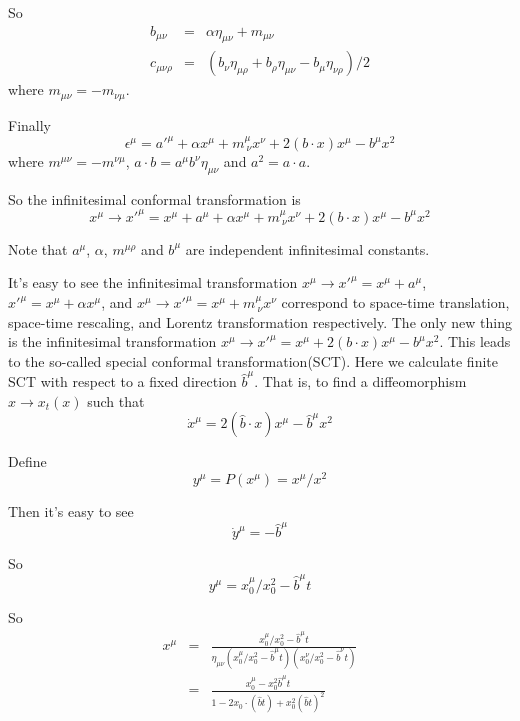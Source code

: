 \documentclass[12pt]{book}
\begin{document}
	So
	\begin{eqnarray}
		b_{\mu\nu}&=&\alpha\eta_{\mu\nu}+m_{\mu\nu}\\
		c_{\mu\nu\rho}&=&(b_\nu\eta_{\mu\rho}+b_\rho\eta_{\mu\nu}-b_\mu\eta_{\nu\rho})/2
	\end{eqnarray}
	where $m_{\mu\nu}=-m_{\nu\mu}$.
	
	Finally
	\begin{equation}
		\epsilon^\mu=a'^\mu+\alpha x^\mu+m^\mu_{\ \nu} x^\nu+2(b\cdot x)x^\mu-b^\mu x^2
	\end{equation}
	where $m^{\mu\nu}=-m^{\nu\mu}$, $a\cdot b=a^\mu b^\nu \eta_{\mu\nu}$ and $a^2=a\cdot a$.
	
	So the infinitesimal conformal transformation is 
	\begin{equation}
		x^\mu\rightarrow x'^\mu=x^\mu+a^\mu+\alpha x^\mu+m^\mu_{\ \nu} x^\nu+2(b\cdot x)x^\mu-b^\mu x^2
	\end{equation}
	
	Note that $a^\mu$, $\alpha$, $m^{\mu\rho}$ and $b^\mu$ are independent infinitesimal constants.
	
	It's easy to see the infinitesimal transformation $x^\mu\rightarrow x'^\mu=x^\mu+a^\mu$, $x'^\mu=x^\mu+\alpha x^\mu$, and $x^\mu\rightarrow x'^\mu=x^\mu+m^\mu_{\ \nu}x^\nu$ correspond to space-time translation, space-time rescaling, and Lorentz transformation respectively. The only new thing is the infinitesimal transformation $x^\mu\rightarrow x'^\mu=x^\mu+2(b\cdot x)x^\mu-b^\mu x^2$. This leads to the so-called special conformal transformation(SCT). Here we calculate finite SCT with respect to a fixed direction $\hat b^\mu$. That is, to find a diffeomorphism $x\rightarrow x_t(x)$ such that 
	\begin{equation}
		\dot x^\mu=2(\hat b\cdot x)x^\mu-\hat b^\mu x^2	
	\end{equation}
	
	Define
	\begin{equation}
		y^\mu=P(x^\mu)=x^\mu/x^2
	\end{equation}
	
	Then it's easy to see
	\begin{equation}
		\dot y^\mu=-\hat b^\mu
	\end{equation}
	
	So
	\begin{equation}
		y^\mu=x_0^\mu/x_0^2-\hat b^\mu t
	\end{equation}
	
	So
	\begin{eqnarray}
		x^\mu&=&\frac{x_0^\mu/x_0^2-\hat b^\mu t}{\eta_{\mu\nu}(x_0^\mu/x_0^2-\hat b^\mu t)(x_0^\nu/x_0^2-\hat b^\nu t)}\\
		&=&\frac{x_0^\mu-x_0^2\hat b^\mu t}{1-2x_0\cdot(\hat b t)+x_0^2(\hat b t)^2}
	\end{eqnarray}
	
\end{document}
